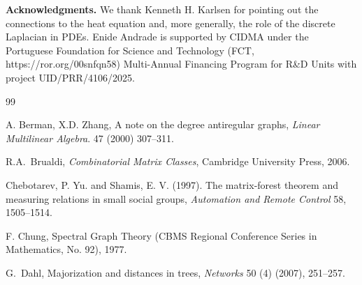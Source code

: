 \documentclass[12pt]{article}
\begin{document}
\bigskip\bigskip
{\bf Acknowledgments.} We thank Kenneth H. Karlsen for pointing out the connections to the heat equation and, more generally, the role of the discrete Laplacian in PDEs.  
Enide Andrade is supported by CIDMA under the
Portuguese Foundation for Science and Technology 
(FCT, https://ror.org/00snfqn58)  
Multi-Annual Financing Program for R\&D Units with project UID/PRR/4106/2025.


\begin{thebibliography}{99}



 A. Berman, X.D. Zhang, A note on the degree antiregular graphs, {\em Linear Multilinear Algebra}. 47 (2000) 307--311.

  R.A.~Brualdi, {\em Combinatorial Matrix Classes}, Cambridge University Press, 2006.

 Chebotarev, P. Yu. and Shamis, E. V. (1997). The matrix-forest theorem and measuring relations in small social groups, {\em Automation and Remote Control} 58, 1505--1514.


 F. Chung, Spectral Graph Theory (CBMS Regional Conference Series in Mathematics, No. 92), 1977.





 G.~Dahl,
Majorization and distances in trees,
{\em Networks} 50 (4) (2007), 251--257.





\end{thebibliography}
\end{document}
